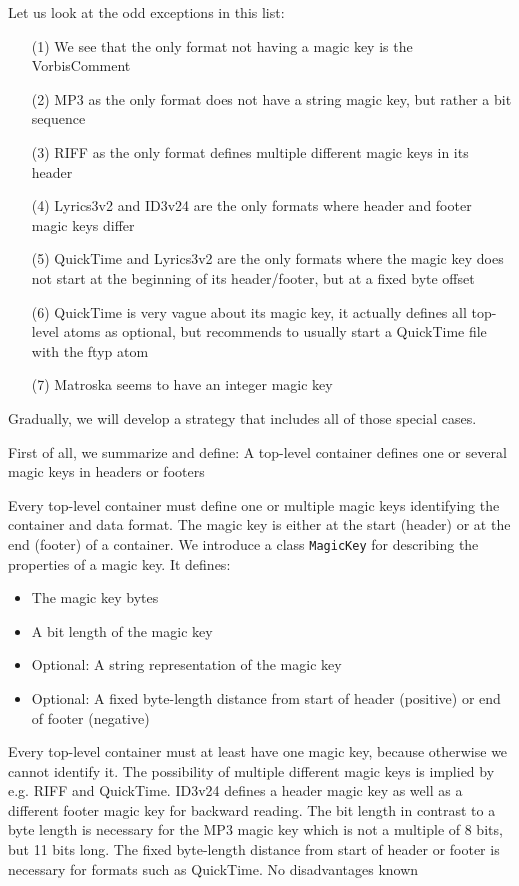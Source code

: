 Let us look at the odd exceptions in this list:
\begin{enumerate}
\item [(1)] We see that the only format not having a magic key is the VorbisComment
\item [(2)] MP3 as the only format does not have a string magic key, but rather a bit sequence
\item [(3)] RIFF as the only format defines multiple different magic keys in its header
\item [(4)] Lyrics3v2 and ID3v24 are the only formats where header and footer magic keys differ
\item [(5)] QuickTime and Lyrics3v2 are the only formats where the magic key does not start at the beginning of its header/footer, but at a fixed byte offset
\item [(6)] QuickTime is very vague about its magic key, it actually defines all top-level atoms as optional, but recommends to usually start a QuickTime file with the ftyp atom
\item [(7)] Matroska seems to have an integer magic key
\end{enumerate}

Gradually, we will develop a strategy that includes all of those special cases.

First of all, we summarize and define:
{%
A top-level container defines one or several magic keys in headers or footers 
}
{%
Every top-level container must define one or multiple magic keys identifying the container and data format. The magic key is either at the start (header) or at the end (footer) of a container. We introduce a class \texttt{MagicKey} for describing the properties of a magic key. It defines:
\begin{itemize}
\item The magic key bytes
\item A bit length of the magic key
\item Optional: A string representation of the magic key
\item Optional: A fixed byte-length distance from start of header (positive) or end of footer (negative)
\end{itemize}
}
{%
Every top-level container must at least have one magic key, because otherwise we cannot identify it. The possibility of multiple different magic keys is implied by e.g. RIFF and QuickTime. ID3v24 defines a header magic key as well as a different footer magic key for backward reading. The bit length in contrast to a byte length is necessary for the MP3 magic key which is not a multiple of 8 bits, but 11 bits long. The fixed byte-length distance from start of header or footer is necessary for formats such as QuickTime. 
}
{%
No disadvantages known
}

